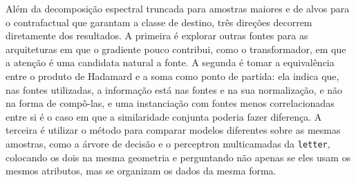 Além da decomposição espectral truncada para amostras maiores e de alvos para o contrafactual que garantam a classe de destino, três direções decorrem diretamente dos resultados. A primeira é explorar outras fontes para as arquiteturas em que o gradiente pouco contribui, como o transformador, em que a atenção é uma candidata natural a fonte. A segunda é tomar a equivalência entre o produto de Hadamard e a soma como ponto de partida: ela indica que, nas fontes utilizadas, a informação está nas fontes e na sua normalização, e não na forma de compô-las, e uma instanciação com fontes menos correlacionadas entre si é o caso em que a similaridade conjunta poderia fazer diferença. A terceira é utilizar o método para comparar modelos diferentes sobre as mesmas amostras, como a árvore de decisão e o perceptron multicamadas da \texttt{letter}, colocando os dois na mesma geometria e perguntando não apenas se eles usam os mesmos atributos, mas se organizam os dados da mesma forma.
